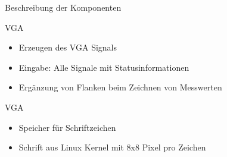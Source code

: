 \begin{frame}[<+->]{Beschreibung der Komponenten}
    \begin{block}{VGA}
        \begin{itemize}
            \item Erzeugen des VGA Signals
            \item Eingabe: Alle Signale mit Statusinformationen
            \item Ergänzung von Flanken beim Zeichnen von Messwerten
        \end{itemize}
    \end{block}
    \begin{block}{VGA}
        \begin{itemize}
            \item Speicher für Schriftzeichen
            \item Schrift aus Linux Kernel mit 8x8 Pixel pro Zeichen
        \end{itemize}
    \end{block}
\end{frame}
